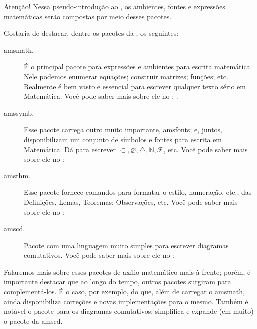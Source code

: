 \begin{atencao}{Atenção!}{\exclamacao}
  Nessa pseudo-introdução ao , os ambientes, fontes e expressões 
  matemáticas serão compostas por meio desses pacotes.
\end{atencao}

Gostaria de destacar, dentre os pacotes da , os seguintes:

\begin{description}
  \item[\textsf{amsmath}.] É o principal pacote para expressões e ambientes para 
    escrita matemática.
    Nele podemos enumerar equações; construir matrizes; funções; etc. 
    Realmente é bem vasto e essencial para escrever qualquer texto sério em 
    Matemática.
    Você pode saber mais sobre ele no : 
    .
  \item[\textsf{amssymb}.] Esse pacote carrega outro muito importante, \textsf{amsfonts}; 
    e, juntos, disponibilizam um conjunto de símbolos e fontes para escrita em 
    Matemática. 
    Dá para escrever $\subset, \varnothing, \triangle, \mathbb{N}, \mathcal{F}$, etc. 
    Você pode saber mais sobre ele no : 
  \item[\textsf{amsthm}.] Esse pacote fornece comandos para formatar o estilo, 
    numeração, etc., das Definições, Lemas, Teoremas; Observações, etc.
    Você pode saber mais sobre ele no : 
  \item[\textsf{amscd}.] Pacote com uma linguagem muito simples para escrever 
    \textsf{diagramas comutativos}. 
    Você pode saber mais sobre ele no : 
\end{description}

Falaremos mais sobre esses pacotes de axílio matemático mais à frente; porém, 
é importante destacar que ao longo do tempo, outros pacotes surgiram para complementá-los.
É o caso, por exemplo, do  
que, além de carregar o \textsf{amsmath}, ainda disponibiliza correções e novas 
implementações para o mesmo.
Também é notável o pacote  para 
os diagramas comutativos: simplifica e expande (em muito) o pacote da 
\textsf{amscd}.

